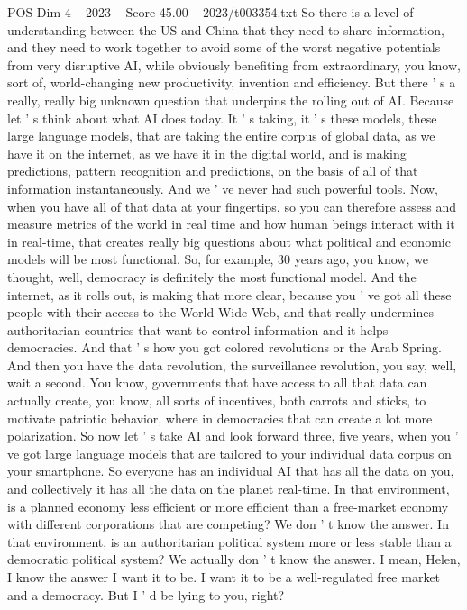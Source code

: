 \begin{textsample}{POS Dim 4 – 2023 – Score 45.00 – 2023/t003354.txt}
So there is a level of understanding between the US and China that they need to share information, and they need to work together to avoid some of the worst negative potentials from very disruptive AI, while obviously benefiting from extraordinary, you know, sort of, world-changing new productivity, invention and efficiency.
But there ' s a really, really big unknown question that underpins the rolling out of AI.
Because let ' s think about what AI does today.
It ' s taking, it ' s these models, these large language models, that are taking the entire corpus of global data, as we have it on the internet, as we have it in the digital world, and is making predictions, pattern recognition and predictions, on the basis of all of that information instantaneously.
And we ' ve never had such powerful tools.
Now, when you have all of that data at your fingertips, so you can therefore assess and measure metrics of the world in real time and how human beings interact with it in real-time, that creates really big questions about what political and economic models will be most functional.
So, for example, 30 years ago, you know, we thought, well, democracy is definitely the most functional model.
And the internet, as it rolls out, is making that more clear, because you ' ve got all these people with their access to the World Wide Web, and that really undermines authoritarian countries that want to control information and it helps democracies.
And that ' s how you got colored revolutions or the Arab Spring.
And then you have the data revolution, the surveillance revolution, you say, well, wait a second.
You know, governments that have access to all that data can actually create, you know, all sorts of incentives, both carrots and sticks, to motivate patriotic behavior, where in democracies that can create a lot more polarization.
So now let ' s take AI and look forward three, five years, when you ' ve got large language models that are tailored to your individual data corpus on your smartphone.
So everyone has an individual AI that has all the data on you, and collectively it has all the data on the planet real-time.
In that environment, is a planned economy less efficient or more efficient than a free-market economy with different corporations that are competing?
We don ' t know the answer.
In that environment, is an authoritarian political system more or less stable than a democratic political system?
We actually don ' t know the answer.
I mean, Helen, I know the answer I want it to be.
I want it to be a well-regulated free market and a democracy.
But I ' d be lying to you, right?

\end{textsample}
